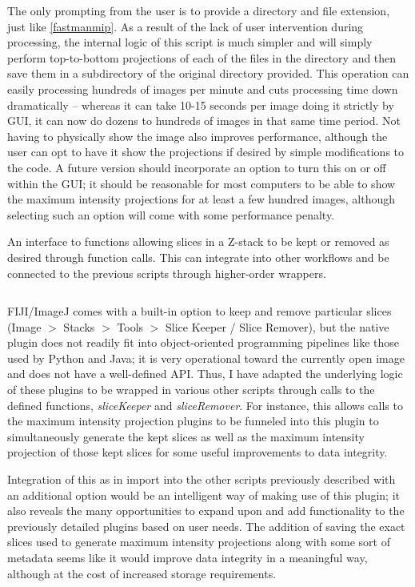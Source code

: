 The only prompting from the user is to provide a directory and file extension, just like \autoref{fastmanmip}. As a result of the lack of user intervention during processing, the internal logic of this script is much simpler and will simply perform top\hyp{}to\hyp{}bottom projections of each of the files in the directory and then save them in a subdirectory of the original directory provided. This operation can easily processing hundreds of images per minute and cuts processing time down dramatically -- whereas it can take 10\hyp{}15 seconds per image doing it strictly by GUI, it can now do dozens to hundreds of images in that same time period. Not having to physically show the image also improves performance, although the user can opt to have it show the projections if desired by simple modifications to the code. A future version should incorporate an option to turn this on or off within the GUI; it should be reasonable for most computers to be able to show the maximum intensity projections for at least a few hundred images, although selecting such an option will come with some performance penalty.

\begin{code}
\caption{An interface to functions allowing slices in a Z\hyp{}stack to be kept or removed as desired through function calls. This can integrate into other workflows and be connected to the previous scripts through higher\hyp{}order wrappers.}
\label{reslicer}

\inputminted[breaklines,frame=single,fontsize=\small]{python}{source/reSlicer.py}

\end{code}

FIJI/ImageJ comes with a built\hyp{}in option to keep and remove particular slices (Image $>$ Stacks $>$ Tools $>$ Slice Keeper / Slice Remover), but the native plugin does not readily fit into object\hyp{}oriented programming pipelines like those used by Python and Java; it is very operational toward the currently open image and does not have a well\hyp{}defined API. Thus, I have adapted the underlying logic of these plugins to be wrapped in various other scripts through calls to the defined functions, \textit{sliceKeeper} and \textit{sliceRemover}. For instance, this allows calls to the maximum intensity projection plugins to be funneled into this plugin to simultaneously generate the kept slices as well as the maximum intensity projection of those kept slices for some useful improvements to data integrity. 

Integration of this as in import into the other scripts previously described with an additional option would be an intelligent way of making use of this plugin; it also reveals the many opportunities to expand upon and add functionality to the previously detailed plugins based on user needs. The addition of saving the exact slices used to generate maximum intensity projections along with some sort of metadata seems like it would improve data integrity in a meaningful way, although at the cost of increased storage requirements.

